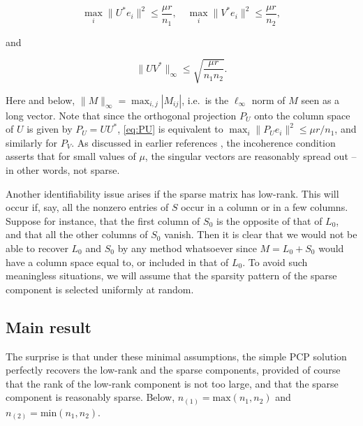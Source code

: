 \begin{equation}
  \label{eq:PU}
  \max_i \|U^* e_i\|^2 \le \frac{\mu r}{n_1}, \quad \max_i \|V^*e_i\|^2 \le
   \frac{\mu r}{n_2}, 
\end{equation}

and

\begin{equation}
  \label{eq:UV}
  \|UV^*\|_\infty \le  \sqrt{\frac{\mu r}{n_1 n_2}}. 
\end{equation}

Here and below, $\|M\|_\infty = \max_{i,j} |M_{ij}|$, i.e.~is the
$\ell_\infty$ norm of $M$ seen as a long vector. Note that since the orthogonal projection $P_U$ onto the column space of $U$ is given by $P_U = UU^*$, \eqref{eq:PU} is equivalent to $\max_i \|P_U e_i\|^2 \le \mu r/n_1$, and similarly for $P_V$.  As discussed in earlier references \cite{CR08,CT09,GrossMC}, the incoherence condition asserts that for small values of $\mu$, the singular vectors are reasonably spread out -- in other words, not sparse.

Another identifiability issue arises if the sparse matrix has low-rank.  This will occur if, say, all the nonzero entries of $S$ occur in a column or in a few columns. Suppose for instance, that the first column of $S_0$ is the opposite of that of $L_0$, and that all the other columns of $S_0$ vanish. Then it is clear that we would not be able to recover $L_0$ and $S_0$ by any method whatsoever since $M = L_0 + S_0$ would have a column space equal to, or included in that of $L_0$. To avoid such meaningless situations, we will assume that the sparsity pattern of the sparse component is selected uniformly at random.

\subsection{Main result}
\label{sec:main}

The surprise is that under these minimal assumptions, the simple PCP solution perfectly recovers the low-rank and the sparse components, provided of course that the rank of the low-rank component is not too large, and that the sparse component is reasonably sparse. Below, $n_{(1)} = \text{max}(n_1,n_2)$ and $n_{(2)} = \text{min}(n_1,n_2)$.

